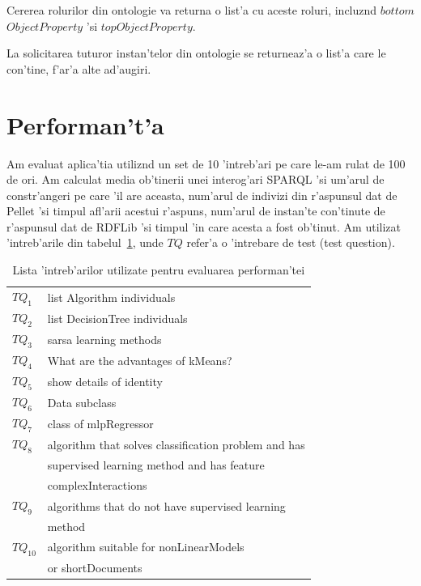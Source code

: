 \documentclass[12pt,a4paper,twoside]{report}
\begin{document}
Cererea rolurilor din ontologie va returna o list'a cu aceste roluri, incluz\ia nd $bottom$ $ObjectProperty$ 'si $topObjectProperty$.

La solicitarea tuturor instan'telor din ontologie se returneaz'a o list'a care le con'tine, f'ar'a alte ad'augiri.

\section{Performan't'a}

Am evaluat aplica'tia utiliz\ia nd un set de 10 'intreb'ari pe care le-am rulat de 100 de ori. Am calculat media ob'tinerii unei interog'ari SPARQL 'si um'arul de constr'angeri pe care 'il are aceasta, num'arul de indivizi din r'aspunsul dat de Pellet 'si timpul afl'arii acestui r'aspuns, num'arul de instan'te con'tinute de r'aspunsul dat de RDFLib 'si timpul 'in care acesta a fost ob'tinut. Am utilizat 'intreb'arile din tabelul~\ref{tab:perfintr}, unde $TQ$ refer'a o 'intrebare de test (test question).

\begin{table}[]
    \centering
\begin{tabular}{ll}
$TQ_1$ & list Algorithm individuals\\
$TQ_2$ & list DecisionTree individuals\\
$TQ_3$ & sarsa learning methods\\
$TQ_4$ & What are the advantages of kMeans?\\
$TQ_5$ & show details of identity\\
$TQ_6$ & Data subclass\\
$TQ_7$ & class of mlpRegressor\\
$TQ_8$ & algorithm that solves classification problem and has\\
 & supervised learning method and has feature \\
 & complexInteractions \\
$TQ_9$ & algorithms that do not have supervised learning  \\
& method \\
$TQ_{10}$ & algorithm suitable for nonLinearModels \\
& or shortDocuments\\
\end{tabular}
    \caption{Lista 'intreb'arilor utilizate pentru evaluarea performan'tei}
    \label{tab:perfintr}
\end{table}
\end{document}
